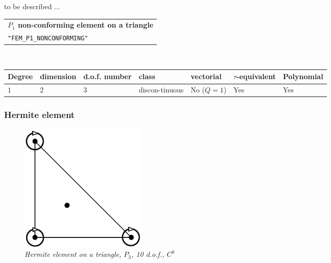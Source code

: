 \documentclass[11pt,a4paper]{article}
\begin{document}
to be described ...
\begin{center}
\begin{tabular}{|m{16.11cm}|} \hline 
{ \bf $P_1$ non-conforming element on a triangle}\\
{\tt "FEM\_P1\_NONCONFORMING"} 
\end{tabular} \\ \vspace{-1pt} 
\begin{tabular}{|m{2cm}|m{2cm}|m{2.5cm}|m{1.2cm}|m{2cm}|m{2cm}|m{1.8cm}|} \hline 
Degree & dimension & d.o.f. number & class & vectorial & \mbox{$\tau$-equivalent} & Polynomial\\ \hline
$1$ & $2$ & $3$ & discon-tinuous & No \mbox{($Q = 1$)} & Yes & Yes\\ \hline
\end{tabular}
\end{center}

\subsubsection{Hermite element}

\begin{figure}[H]
  \begin{center}
    \includegraphics[width=6cm,angle=0]{getfemlist_triangle_hermite.eps}
  \end{center}
  \caption{ \it Hermite element on a triangle, $P_3$, 10 d.o.f., $C^0$}
  \label{fig:triangle_hermite}
\end{figure}
\end{document}

